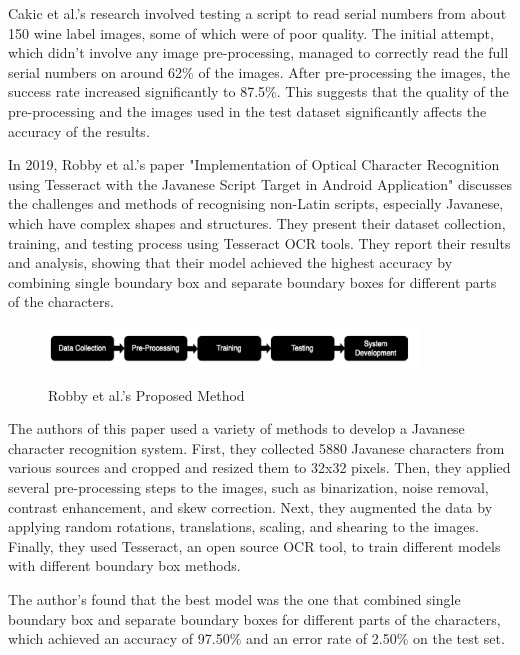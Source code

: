 Cakic et al.'s research involved testing a script to read serial numbers from about 150 wine label images, some of which were of poor quality. The initial attempt, which didn't involve any image pre-processing, managed to correctly read the full serial numbers on around 62\% of the images. After pre-processing the images, the success rate increased significantly to 87.5\%. This suggests that the quality of the pre-processing and the images used in the test dataset significantly affects the accuracy of the results.

In 2019, Robby et al.'s paper "Implementation of Optical Character Recognition using Tesseract with the Javanese Script Target in Android Application" discusses the challenges and methods of recognising non-Latin scripts, especially Javanese, which have complex shapes and structures. They present their dataset collection, training, and testing process using Tesseract OCR tools. They report their results and analysis, showing that their model achieved the highest accuracy by combining single boundary box and separate boundary boxes for different parts of the characters.

\begin{figure}[ht]
    \centering
    \includegraphics[width=0.88\textwidth]{Figures/tesseract_papers/Robby_2019.jpg}
    \caption[Robby et al.'s Proposed Method]{Robby et al.'s Proposed Method}\cite{robbyImplementationOpticalCharacter2019}
    \label{fig:Robby et al.'s Proposed Method}
\end{figure}


The authors of this paper used a variety of methods to develop a Javanese character recognition system. First, they collected 5880 Javanese characters from various sources and cropped and resized them to 32x32 pixels. Then, they applied several pre-processing steps to the images, such as binarization, noise removal, contrast enhancement, and skew correction. Next, they augmented the data by applying random rotations, translations, scaling, and shearing to the images. Finally, they used Tesseract, an open source OCR tool, to train different models with different boundary box methods.

The author's found that the best model was the one that combined single boundary box and separate boundary boxes for different parts of the characters, which achieved an accuracy of 97.50\% and an error rate of 2.50\% on the test set.


